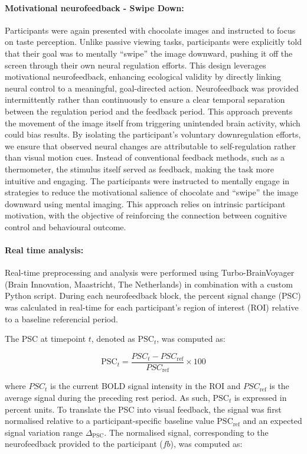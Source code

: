 \documentclass[]{imag-ms-template}
\begin{document}
\paragraph{Motivational neurofeedback - Swipe Down:} Participants were again presented with chocolate images and instructed to focus on taste perception. Unlike passive viewing tasks, participants were explicitly told that their goal was to mentally “swipe” the image downward, pushing it off the screen through their own neural regulation efforts. This design leverages motivational neurofeedback, enhancing ecological validity by directly linking neural control to a meaningful, goal-directed action.
Neurofeedback was provided intermittently rather than continuously to ensure a clear temporal separation between the regulation period and the feedback period. This approach prevents the movement of the image itself from triggering unintended brain activity, which could bias results. By isolating the participant’s voluntary downregulation efforts, we ensure that observed neural changes are attributable to self-regulation rather than visual motion cues. Instead of conventional feedback methods, such as a thermometer, the stimulus itself served as feedback, making the task more intuitive and engaging.
The participants were instructed to mentally engage in strategies to reduce the motivational salience of chocolate and “swipe” the image downward using mental imaging. This approach relies on intrinsic participant motivation, with the objective of reinforcing the connection between cognitive control and behavioural outcome.

\paragraph{Real time analysis:} Real-time preprocessing and analysis were performed using Turbo-BrainVoyager (Brain Innovation, Maastricht, The Netherlands) in combination with a custom Python script. During each neurofeedback block, the percent signal change (PSC) was calculated in real-time for each participant's region of interest (ROI) relative to a baseline referencial period.

The PSC at timepoint $t$, denoted as $\mathrm{PSC}_t$, was computed as:

\begin{equation}
\mathrm{PSC}_t = \frac{PSC_t - PSC_{\mathrm{ref}}}{PSC_{\mathrm{ref}}} \times 100
\end{equation}

where $PSC_t$ is the current BOLD signal intensity in the ROI and $PSC_{\mathrm{ref}}$ is the average signal during the preceding rest period. As such, $\mathrm{PSC}_t$ is expressed in percent units. To translate the PSC into visual feedback, the signal was first normalised relative to a participant-specific baseline value $\mathrm{PSC}_{\mathrm{ref}}$ and an expected signal variation range $\Delta_{\mathrm{PSC}}$. The normalised signal, corresponding to the neurofeedback provided to the participant ($fb$), was computed as:
\end{document}

